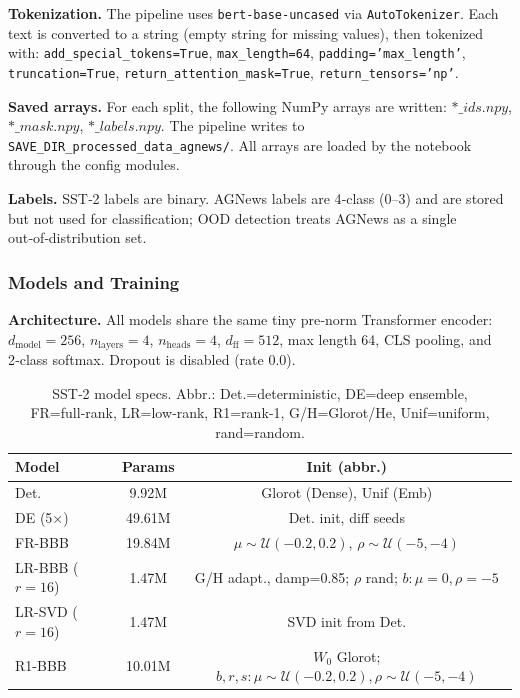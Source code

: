 \documentclass{article}
\theoremstyle{plain}
\theoremstyle{definition}
\theoremstyle{remark}
\begin{document}
\textbf{Tokenization.} The pipeline uses \texttt{bert-base-uncased} via \texttt{AutoTokenizer}. Each text is converted to a string (empty string for missing values), then tokenized with:
\texttt{add\_special\_tokens=True}, \texttt{max\_length=64}, \texttt{padding='max\_length'}, \texttt{truncation=True}, \texttt{return\_attention\_mask=True}, \texttt{return\_tensors='np'}.

\textbf{Saved arrays.} For each split, the following NumPy arrays are written:
\texttt{$*\_ids.npy$}, \texttt{$*\_mask.npy$}, \texttt{$*\_labels.npy$}. The pipeline writes to \texttt{SAVE\_DIR\_processed\_data\_agnews/}. All arrays are loaded by the notebook through the config modules.

\textbf{Labels.} SST‑2 labels are binary. AGNews labels are 4‑class (0–3) and are stored but not used for classification; OOD detection treats AGNews as a single out‑of‑distribution set.

\subsubsection{Models and Training}

\textbf{Architecture.} All models share the same tiny pre‑norm Transformer encoder:
$d_{\text{model}}=256$, $n_{\text{layers}}=4$, $n_{\text{heads}}=4$, $d_{\text{ff}}=512$, max length 64, CLS pooling, and 2‑class softmax. Dropout is disabled (rate 0.0).
\begin{table}[h]
\small
\centering
\begin{tabular}{lcc}
\toprule
\textbf{Model} & \textbf{Params} & \textbf{Init (abbr.)} \\
\midrule
Det. & 9.92M & Glorot (Dense), Unif (Emb) \\
DE (5×) & 49.61M & Det. init, diff seeds \\
FR-BBB & 19.84M & $\mu \sim \mathcal{U}(-0.2,0.2)$, $\rho \sim \mathcal{U}(-5,-4)$ \\
LR-BBB ($r{=}16$) & 1.47M & G/H adapt., damp=0.85; $\rho$ rand; $b:\mu{=}0,\rho{=}{-}5$ \\
LR-SVD ($r{=}16$) & 1.47M & SVD init from Det. \\
R1-BBB & 10.01M & $W_0$ Glorot; $b,r,s:\mu\sim\mathcal{U}(-0.2,0.2),\rho\sim\mathcal{U}(-5,-4)$ \\
\bottomrule
\end{tabular}
\caption{SST‑2 model specs. Abbr.: Det.=deterministic, DE=deep ensemble, FR=full‑rank, LR=low‑rank, R1=rank‑1, G/H=Glorot/He, Unif=uniform, rand=random.}
\label{tab:sst2_models}
\end{table}
\end{document}
